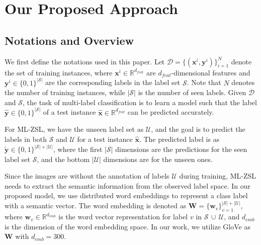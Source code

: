 \documentclass[10pt,twocolumn,letterpaper]{article}
\begin{document}
\section{Our Proposed Approach}\subsection{Notations and Overview}
We first define the notations used in this paper. Let $\mathcal{D}=\{(\mathbf{x}^i,\mathbf{y}^i)\}_{i=1}^N$ denote the set of training instances, where $\mathbf{x}^i \in \mathbb{R}^{d_{feat}}$ are $d_{feat}$-dimensional features and $\mathbf{y}^i \in \{0,1\}^{|\mathcal{S}|}$ are the corresponding labels in the label set $\mathcal{S}$.
Note that $N$ denotes the number of training instances, while $|\mathcal{S}|$ is the number of seen labels. 
Given $\mathcal{D}$ and $\mathcal{S}$, the task of multi-label classification is to learn a model such that the label $\hat{\mathbf{y}}\in \{0,1\}^{|\mathcal{S}|}$ of a test instance $\hat{\mathbf{x}}\in \mathbb{R}^{d_{feat}}$ can be predicted accurately.

For ML-ZSL, we have the unseen label set as $\mathcal{U}$, and the goal is to predict the labels in both $\mathcal{S}$ and $\mathcal{U}$ for a test instance $\hat{\mathbf{x}}$.
The predicted label is as $\tilde{\mathbf{y}}\in \{0,1\}^{|\mathcal{S}|+\mathcal{|U|}}$, where the first $|\mathcal{S}|$ dimensions are the predictions for the seen label set $\mathcal{S}$, and the bottom $|\mathcal{U}|$ dimensions are for the unseen ones. 

Since the images are without the annotation of labels $\mathcal{U}$ during training, ML-ZSL needs to extract the semantic information from the observed label space. In our proposed model, we use distributed word embeddings to represent a class label with a semantic vector. The word embedding is denoted as $\mathbf{W} = \{\mathbf{\mathbf{w}}_v\}_{v=1}^{|\mathcal{S}|+\mathcal{|U|}}$, where $\mathbf{w}_v \in \mathbb{R}^{d_{emb}}$ is the word vector representation for label $v$ in $\mathcal{S}\,\cup\,\mathcal{U}$, and $d_{emb}$ is the dimension of the word embedding space. 
In our work, we utilize GloVe \cite{pennington2014glove} as $\mathbf{W}$ with $d_{emb}=300$.
\end{document}
